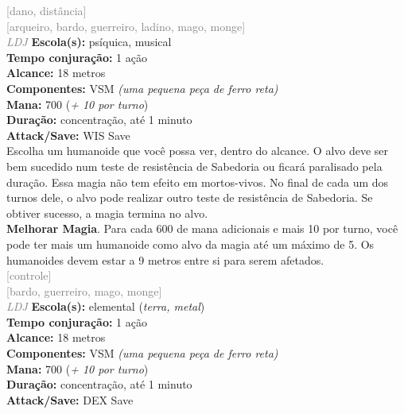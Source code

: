 \documentclass{RPG_Adventure}[2021/10/20]
\begin{document}
{\scriptsize \textcolor{gray}{[dano, distância]\\}}
{\scriptsize \textcolor{gray}{[arqueiro, bardo, guerreiro, ladino, mago, monge]\\}}
{\tiny \textcolor{gray}{\textit{LDJ}}}\jump{}
{\small \t \textbf{Escola(s):} psíquica, musical\\\t \textbf{Tempo conjuração:} 1 ação\\\t \textbf{Alcance:} 18 metros\\\t \textbf{Componentes:} VSM \textit{(uma pequena peça de ferro reta)}\\\t \textbf{Mana:} 700 (\textit{+ 10 por turno})\\\t \textbf{Duração:} concentração, até 1 minuto\\\t \textbf{Attack/Save:} WIS Save\\}
{\normalsize Escolha um humanoide que você possa ver, dentro do alcance. O alvo deve ser bem sucedido num teste de resistência de Sabedoria ou ficará paralisado pela duração. Essa magia não tem efeito em mortos-vivos. No final de cada um dos turnos dele, o alvo pode realizar outro teste de resistência de Sabedoria. Se obtiver sucesso, a magia termina no alvo.\\\t \textbf{Melhorar Magia}. Para cada 600 de mana adicionais e mais 10 por turno, você pode ter mais um humanoide como alvo da magia até um máximo de 5. Os humanoides devem estar a 9 metros entre si para serem afetados.\\}
{\scriptsize \textcolor{gray}{[controle]\\}}
{\scriptsize \textcolor{gray}{[bardo, guerreiro, mago, monge]\\}}
{\tiny \textcolor{gray}{\textit{LDJ}}}\jump{}
{\small \t \textbf{Escola(s):} elemental (\textit{terra, metal})\\\t \textbf{Tempo conjuração:} 1 ação\\\t \textbf{Alcance:} 18 metros\\\t \textbf{Componentes:} VSM \textit{(uma pequena peça de ferro reta)}\\\t \textbf{Mana:} 700 (\textit{+ 10 por turno})\\\t \textbf{Duração:} concentração, até 1 minuto\\\t \textbf{Attack/Save:} DEX Save\\}
\end{document}
